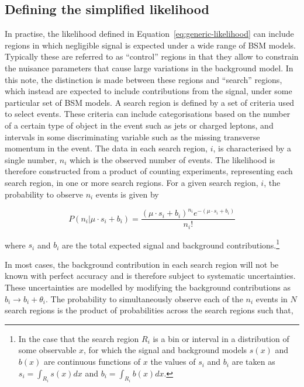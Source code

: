\subsection{Defining the simplified likelihood}
In practise, the likelihood defined in Equation~\ref{eq:generic-likelihood} can include regions in which negligible signal is expected under a wide 
range of BSM models. Typically these are referred to as ``control'' regions in that they allow to constrain the nuisance parameters that  
cause large variations in the background model.
In this note, the distinction is made between these regions and ``search'' regions, which instead 
are expected to include contributions from the signal, under some particular set of BSM models. A search region 
is defined by a set of criteria used to select events. These criteria can include categorisations based on 
the number of a certain type of object in the event such as jets or 
charged leptons, and intervals in some discriminating variable such as the missing transverse momentum in the event. The data in each search region, $i$, is characterised 
by a single number, $n_{i}$ which is the observed number of events. The likelihood is therefore constructed from a product of counting 
experiments, representing each search region, in one or more search regions. 
For a given search region, $i$, the probability to observe $n_{i}$ events is given by

\begin{equation}
 P(n_{i}|\mu \cdot s_{i}+b_{i}) = \dfrac{(\mu \cdot s_{i}+b_{i})^{n_{i}} e^{-(\mu \cdot s_{i}+b_{i})} }{n_{i}!}
\label{eq:poisson-likelihood}
\end{equation}

where $s_{i}$ and $b_{i}$ are the total expected signal and background contributions.\footnote{In the case 
that the search region $R_{i}$ is a bin or interval in a distribution of some observable $x$, for which the signal and background models $s(x)$ 
and $b(x)$ are continuous functions of $x$ the values of $s_{i}$ and $b_{i}$ are taken as 
$s_{i}=\int_{R_{i}} s(x)dx$ and $b_{i}=\int_{R_{i}} b(x)dx$.}

In most cases, the background contribution in each search region will not be known with perfect accuracy and is therefore 
subject to systematic uncertainties. These uncertainties are modelled by modifying the background contributions as 
$b_{i}\rightarrow b_{i}+\theta_{i}$. 
The probability to simultaneously observe each of the $n_{i}$ events in $N$ search regions is the product of probabilities across the search regions such that,

